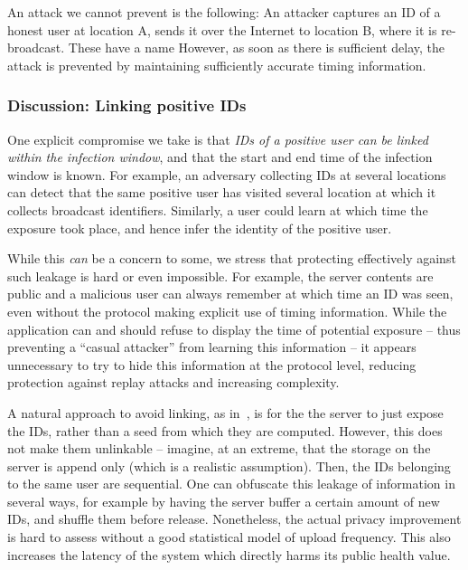 \documentclass{article}
\newcommand{\TODO}[1]{ {\color{blue} #1 }}
\begin{document}
An attack we cannot prevent is the following: An attacker captures an ID of a honest user at location A, sends it over the Internet to location B, where it is re-broadcast. \TODO{These have a name}  However, as soon as there is sufficient delay, the attack is prevented by maintaining sufficiently accurate timing information.    

\subsubsection{Discussion: Linking positive IDs} 

One explicit compromise we take is that {\em IDs of a positive user can be linked within the infection window}, and that the start and end time of the infection window is known. For example, an adversary collecting IDs at several locations can detect that the same positive user has visited several location at which it collects broadcast identifiers. Similarly, a user could learn at which time the exposure took place, and hence infer the identity of the positive user.  

While this {\em can} be a concern to some, we stress that protecting effectively against such leakage is hard or even impossible. For example, the server contents are public and a malicious user can always remember at which time an ID was seen, even without the protocol making explicit use of timing information. While the application can and should refuse to display the time of potential exposure -- thus preventing a ``casual attacker'' from learning this information -- it appears unnecessary to try to hide this information at the protocol level, reducing protection against replay attacks and increasing complexity.


A natural approach to avoid linking, as in~\cite{BU}, is for the the server to just expose the IDs, rather than a seed from which they are computed. However, this does not make them unlinkable -- imagine, at an extreme, that the storage on the server is append only (which is a realistic assumption). Then, the IDs belonging to the same user are sequential. One can obfuscate this leakage of information in several ways, for example by having the server buffer a certain amount of new IDs, and shuffle them before release. Nonetheless, the actual privacy improvement is hard to assess without a good statistical model of upload frequency. This also increases the latency of the system which directly harms its public health value.

\end{document}
